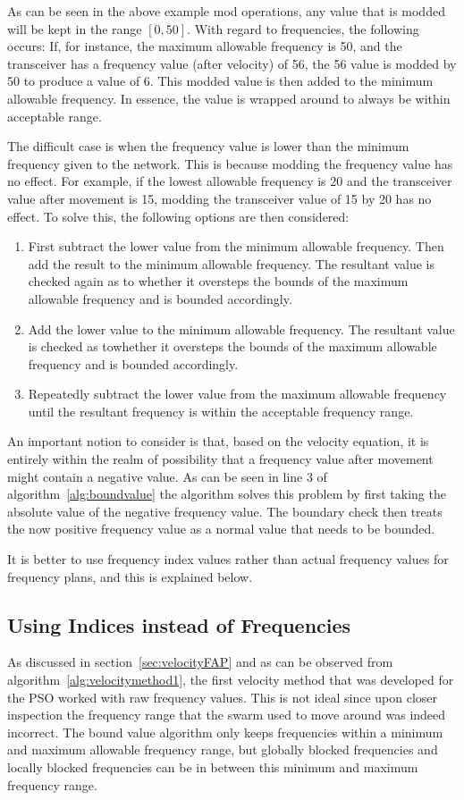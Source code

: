 As can be seen in the above example mod operations, any value that is modded will be kept in the range $[0,50]$. With regard to frequencies, the following occurs: If, for instance, the maximum allowable frequency is 50, and the transceiver has a frequency value (after velocity) of 56, the 56 value is modded by 50 to produce a value of 6. This modded value is then added to the minimum allowable frequency. In essence, the value is wrapped around to always be within acceptable range. 

The difficult case is when the frequency value is lower than the minimum frequency given to the network. This is because modding the frequency value has no effect. For example, if the lowest allowable frequency is 20 and the transceiver value after movement is 15, modding the transceiver value of 15 by 20 has no effect. To solve this, the following options are then considered:

\begin{enumerate}
\item First subtract the lower value from the minimum allowable frequency. Then add the result to the minimum allowable frequency. The resultant value is checked again as to whether it oversteps the bounds of the maximum allowable frequency and is bounded accordingly.
\item Add the lower value to the minimum allowable frequency. The resultant value is checked as towhether it oversteps the bounds of the maximum allowable frequency and is bounded accordingly.
\item Repeatedly subtract the lower value from the maximum allowable frequency until the resultant frequency is within the acceptable frequency range.
\end{enumerate}

An important notion to consider is that, based on the velocity equation, it is entirely within the realm of possibility that a frequency value after movement might contain a negative value. As can be seen in line 3 of algorithm~\ref{alg:boundvalue} the algorithm solves this problem by first taking the absolute value of the negative frequency value. The boundary check then treats the now positive frequency value as a normal value that needs to be bounded.

It is better to use frequency index values rather than actual frequency values for frequency plans, and this is explained below.
\subsection{Using Indices instead of Frequencies}
\label{sec:velocityFAP2}
As discussed in section~\ref{sec:velocityFAP} and as can be observed from algorithm~\ref{alg:velocitymethod1}, the first velocity method that was developed for the \gls{PSO} worked with raw frequency values. This is not ideal since upon closer inspection the frequency range that the swarm used to move around was indeed incorrect. The bound value algorithm only keeps frequencies within a minimum and maximum allowable frequency range, but globally blocked frequencies and locally blocked frequencies can be in between this minimum and maximum frequency range. 

